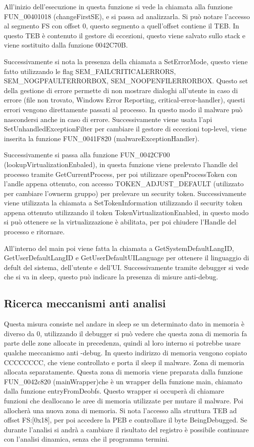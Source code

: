 \documentclass[]{article}
\begin{document}
All'inizio dell'esecuzione in questa funzione si vede la chiamata alla funzione FUN\_00401018 (changeFirstSE), e si passa ad analizzarla. Si può notare l'accesso al segmento FS con offset 0, questo segmento a quell'offset contiene il TEB. In questo TEB è contenuto il gestore di eccezioni, questo viene salvato sullo stack e viene sostituito dalla funzione 0042C70B.

Successivamente si nota la presenza della chiamata a SetErrorMode, questo viene fatto utilizzando le flag SEM\_FAILCRITICALERRORS, SEM\_NOGPFAULTERRORBOX, SEM\_NOOPENFILERRORBOX. Questo set della gestione di errore permette di non mostrare dialoghi all'utente in caso di errore (file non trovato, Windows Error Reporting, critical-error-handler), questi errori vengono direttamente passati al processo. In questo modo il malware può nascondersi anche in caso di errore. Successivamente viene usata l'api SetUnhandledExceptionFilter per cambiare il gestore di eccezioni top-level, viene inserita la funzione FUN\_0041F820 (malwareExceptionHandler).

Successivamente si passa alla funzione FUN\_0042CF00 (lookupVirtualizationEnbaled), in questa funzione viene prelevato l'handle del processo tramite GetCurrentProcess, per poi utilizzare openProcessToken con l'andle appena ottenuto, con accesso TOKEN\_ADJUST\_DEFAULT (utilizzato per cambiare l'ownerm gruppo) per prelevare un security token. Successivamente viene utilizzata la chiamata a SetTokenInformation utilizzando il security token appena ottenuto utilizzando il token TokenVirtualizationEnabled, in questo modo si può ottenere se la virtualizzazione è abilitata, per poi chiudere l'Handle del processo e ritornare.

All'interno del main poi viene fatta la chiamata a GetSystemDefaultLangID, GetUserDefaultLangID e GetUserDefaultUILanguage per ottenere il linguaggio di defult del sistema, dell'utente e dell'UI. Successivamente tramite debugger si vede che si va in sleep, questo può indicare la presenza di misure anti-debug. 

\subsection{Ricerca meccanismi anti analisi}
Questa misura consiste nel andare in sleep se un determinato dato in memoria è diverso da 0, utilizzando il debugger si può vedere che questa zona di memoria fa parte delle zone allocate in precedenza, quindi al loro interno si potrebbe usare qualche meccanismo anti -debug. In questo indirizzo di memoria vengono copiato CCCCCCCC, che viene controllato e porta il sleep il malware.  Zona di memoria allocata separatamente. Questa zona di memoria viene preparata dalla funzione FUN\_0042c820 (mainWrapper)che è un wrapper della funzione main, chiamato dalla funzione entryFromDeobfs.  Questo wrapper si occuperà di chiamare funzioni che deallocano le aree di memoria utilizzate per mutare il malware. Poi allocherà una nuova zona di memoria. Si nota l'accesso alla struttura TEB ad offset FS:[0x18], per poi accedere la PEB e controllare il byte BeingDebugged. Se durante l'analisi si andrà a cambiare il risultato del registro è possibile continuare con l'analisi dinamica, senza che il programma termini.
\end{document}
